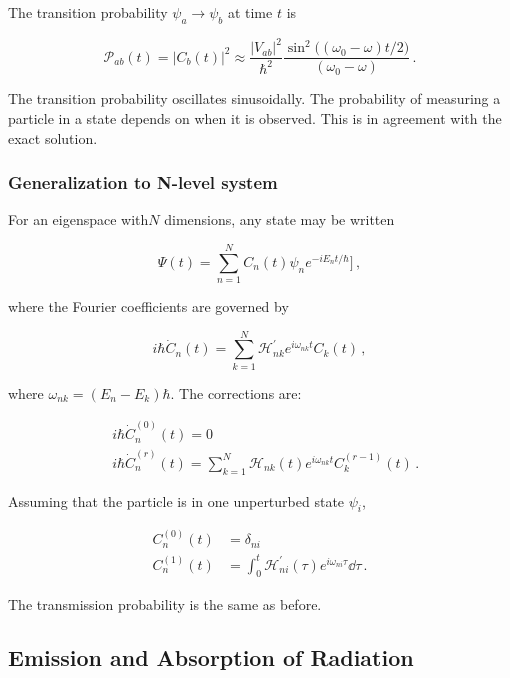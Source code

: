 \documentclass[12pt, titlepage]{article}
\begin{document}
The transition probability $\psi_a \rightarrow \psi_b$ at time $t$ is

\begin{equation}
	\mathscr{P}_{ab}(t) = |C_b(t)|^2 \approx \frac{|V_{ab}|^2}{\hbar^2}\frac{\sin^2\bigl((\omega_0 - \omega)t/2\bigr)}{(\omega_0 - \omega)} \,.
\end{equation}


The transition probability oscillates sinusoidally. The probability of measuring a particle in a state depends on when it is observed. This is in agreement with the exact solution.

\subsubsection{Generalization to N-level system}
For an eigenspace with$N$ dimensions, any state may be written

\begin{equation}
	\Psi(t) = \sum_{n=1}^{N}C_n(t)\psi_ne^{-iE_n t/\hbar} ]\,,
\end{equation}

where the Fourier coefficients are governed by

\begin{equation}
	i\hbar \dot{C}_n(t) = \sum_{k=1}^{N}\mathcal{H}_{nk}^\prime e^{i\omega_{nk}t}C_{k}(t) \,,
\end{equation}

where $\omega_{nk} = (E_n - E_k)\hbar$. The corrections are:

\begin{align}
	& i\hbar\dot{C}_n^{(0)}(t) = 0 \\[4pt]
	& i\hbar\dot{C}_n^{(r)}(t) = \sum_{k=1}^{N}\mathcal{H}_{nk}(t)e^{i\omega_{nk}t}C_{k}^{(r-1)}(t) \,.
\end{align}

Assuming that the particle is in one unperturbed state $\psi_i$,

\begin{align}
	C_n^{(0)}(t) &= \delta_{ni} \\[4pt]
	C_n^{(1)}(t) &= \int_{0}^{t}\mathcal{H}^\prime_{ni}(\tau)e^{i\omega_{ni}\tau}\dd{\tau} \,.
\end{align}

The transmission probability is the same as before.

\subsection{Emission and Absorption of Radiation}
\end{document}
